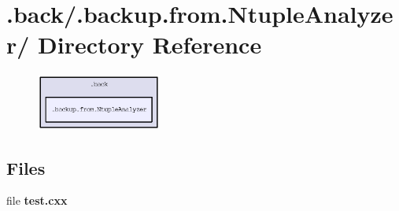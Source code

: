 \section{.back/.backup.from.Ntuple\-Analyzer/ Directory Reference}
\label{dir_1a1d668d69bcfd489b3d96586c7cd7d7}


\begin{figure}[H]
\begin{center}
\leavevmode
\includegraphics[width=116pt]{dir_1a1d668d69bcfd489b3d96586c7cd7d7_dep}
\end{center}
\end{figure}
\subsection*{Files}
\begin{CompactItemize}
\item 
file \textbf{test.cxx}
\end{CompactItemize}
